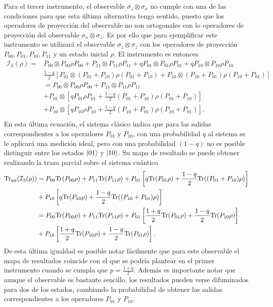Para el tercer instrumento, el observable $\sigma_z\otimes \sigma_x$ no cumple
con una de las condiciones para que esta última alternativa tenga sentido,
puesto que los operadores de proyección del observable no son ortogonales con lo operadores de proyección del observable $\sigma_x\otimes \sigma_z$. %
Es por ello que para ejemplificar este instrumento se
utilizará el observable $\sigma_z\otimes \sigma_z$ con los operadores de
proyección $P_{00},P_{01},P_{10},P_{11}$ y un estado inicial $\rho$. El
instrumento es entonces 
\[\begin{split}\mathcal{I}_3(\rho)=&P_{00}\otimes P_{00}\rho P_{00}+P_{11}\otimes P_{11}\rho P_{11}+q P_{01}\otimes P_{01}\rho P_{01}+q P_{10}\otimes P_{10}\rho P_{10}\\
&\frac{1-q}{2}\left[P_{01}\otimes (P_{01}+P_{10})\rho(P_{01}+P_{10})+ P_{10}\otimes(P_{10}+P_{01})\rho (P_{10}+P_{01}) \right]\\
&=P_{00}\otimes P_{00}\rho P_{00}+P_{11}\otimes P_{11}\rho P_{11}\\
&+P_{01}\otimes \left[q P_{01}\rho P_{01}+\frac{1-q}{2}(P_{01}+P_{10})\rho(P_{01}+P_{10})\right]\\
&+P_{10}\otimes \left[q P_{10}\rho P_{10}+\frac{1-q}{2}(P_{10}+P_{01})\rho (P_{10}+P_{01}) \right].\\
 \end{split}\] 
En esta última ecuación, el sistema clásico indica que para las salidas correspondientes a los operadores $ P_{01}$ y $P_{10}$, con una probabilidad $q$ al sistema se le aplicará una medición ideal, pero con una probabilidad $(1-q)$ no es posible distinguir entre los estados $|01\rangle$ y $|10\rangle$. Su mapa de resultado se puede obtener realizando la traza parcial sobre el sistema cuántico \[\begin{split}{\rm Tr}_{\text{qu}}(\mathcal{I}_3(\rho)) &=P_{00} {\rm Tr}(P_{00}\rho)+P_{11}{\rm Tr}(P_{11}\rho)+P_{01}\left[q {\rm Tr}(P_{01}\rho)+\frac{1-q}{2}{\rm Tr}((P_{01}+P_{10})\rho)\right]\\
    &+P_{10} \left[q {\rm Tr}(P_{10}\rho)+\frac{1-q}{2}{\rm Tr}((P_{10}+P_{01})\rho)\right]\\
    &=P_{00} {\rm Tr}(P_{00}\rho)+P_{11}{\rm Tr}(P_{11}\rho)+P_{01}\left[\frac{1+q}{2} {\rm Tr}(P_{01}\rho)+\frac{1-q}{2}{\rm Tr}(P_{10}\rho)\right]\\
    &+P_{10} \left[\frac{1+q}{2} {\rm Tr}(P_{10}\rho)+\frac{1-q}{2}{\rm Tr}(P_{01}\rho)\right].\\
\end{split}\] 
De esta última igualdad es posible notar fácilmente que para este observable el
mapa de resultados coincide con el que se podría plantear en el primer
instrumento cuando se cumpla que $p=\frac{1+q}{2}$. Además es importante notar
que aunque el observable es bastante sencillo, los resultados pueden verse
difuminados para dos de los estados, cambiando la probabilidad de obtener las
salidas correspondientes a los operadores $P_{01}$ y $P_{10}$.


